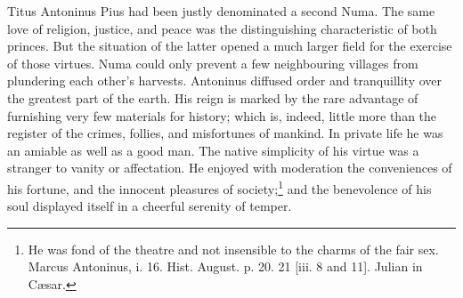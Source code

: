 Titus Antoninus Pius had been justly denominated a second Numa. The same love of religion, justice, and peace was the distinguishing characteristic of both princes. But the situation of the latter opened a much larger field for the exercise of those virtues. Numa could only prevent a few neighbouring villages from plundering each other\texthebrew{}’s harvests. Antoninus diffused order and tranquillity over the greatest part of the earth. His reign is marked by the rare advantage of furnishing very few materials for history; which is, indeed, little more than the register of the crimes, follies, and misfortunes of mankind. In private life he was an amiable as well as a good man. The native simplicity of his virtue was a stranger to vanity or affectation. He enjoyed with moderation the conveniences of his fortune, and the innocent pleasures of society;\footnote{He was fond of the theatre and not insensible to the charms of the fair sex. Marcus Antoninus, i. 16. Hist. August. p. 20. 21 [iii. 8 and 11]. Julian in Cæsar.} and the benevolence of his soul displayed itself in a cheerful serenity of temper.

